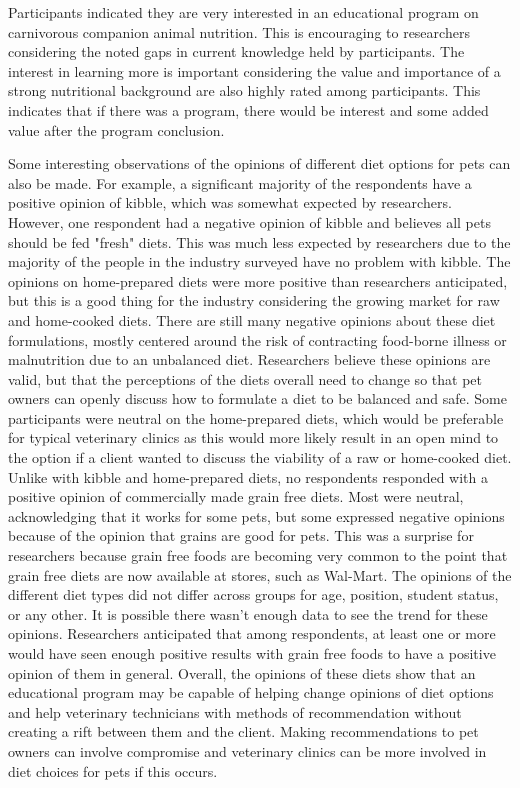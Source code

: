 \par Participants indicated they are very interested in an educational program on carnivorous companion animal nutrition. This is encouraging to researchers considering the noted gaps in current knowledge held by participants. The interest in learning more is important considering the value and importance of a strong nutritional background are also highly rated among participants. This indicates that if there was a program, there would be interest and some added value after the program conclusion.
\par Some interesting observations of the opinions of different diet options for pets can also be made. For example, a significant majority of the respondents have a positive opinion of kibble, which was somewhat expected by researchers. However, one respondent had a negative opinion of kibble and believes all pets should be fed "fresh" diets. This was much less expected by researchers due to the majority of the people in the industry surveyed have no problem with kibble. The opinions on home-prepared diets were more positive than researchers anticipated, but this is a good thing for the industry considering the growing market for raw and home-cooked diets. There are still many negative opinions about these diet formulations, mostly centered around the risk of contracting food-borne illness or malnutrition due to an unbalanced diet. Researchers believe these opinions are valid, but that the perceptions of the diets overall need to change so that pet owners can openly discuss how to formulate a diet to be balanced and safe. Some participants were neutral on the home-prepared diets, which would be preferable for typical veterinary clinics as this would more likely result in an open mind to the option if a client wanted to discuss the viability of a raw or home-cooked diet. Unlike with kibble and home-prepared diets, no respondents responded with a positive opinion of commercially made grain free diets. Most were neutral, acknowledging that it works for some pets, but some expressed negative opinions because of the opinion that grains are good for pets. This was a surprise for researchers because grain free foods are becoming very common to the point that grain free diets are now available at stores, such as Wal-Mart. The opinions of the different diet types did not differ across groups for age, position, student status, or any other. It is possible there wasn't enough data to see the trend for these opinions. Researchers anticipated that among respondents, at least one or more would have seen enough positive results with grain free foods to have a positive opinion of them in general. Overall, the opinions of these diets show that an educational program may be capable of helping change opinions of diet options and help veterinary technicians with methods of recommendation without creating a rift between them and the client. Making recommendations to pet owners can involve compromise and veterinary clinics can be more involved in diet choices for pets if this occurs.

